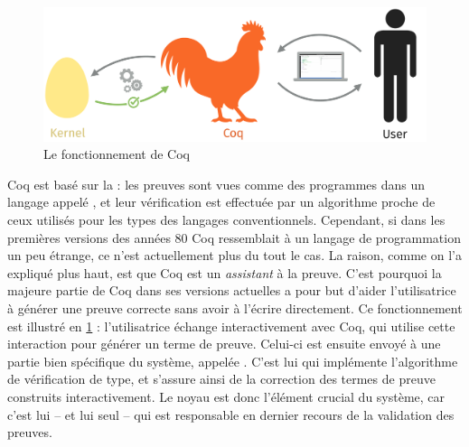   \begin{figure}[h]

    \centering
    \includegraphics{./figures/coq-kernel-fr.pdf}
  
    \caption{Le fonctionnement de Coq}
    \label{fig-coq}
  \end{figure}

  Coq est basé sur la  : les preuves sont vues comme des programmes dans un langage appelé ,
  et leur vérification est effectuée par un algorithme proche
  de ceux utilisés pour les types des langages conventionnels.
  Cependant, si dans les premières versions des années 80 Coq ressemblait à un langage de programmation un peu étrange, ce n’est actuellement plus du tout le cas.
  La raison, comme on l’a expliqué plus haut, est que Coq est un \emph{assistant} à la preuve.
  C’est pourquoi la majeure partie de Coq dans ses versions actuelles a pour but d’aider l’utilisatrice à générer une preuve correcte sans avoir à l’écrire directement.
  Ce fonctionnement est illustré en \cref{fig-coq} : l’utilisatrice échange interactivement avec Coq, qui utilise cette interaction pour générer un terme de preuve. Celui-ci est ensuite envoyé à une partie bien spécifique du système, appelée .
  C’est lui qui implémente l’algorithme de vérification de type, et s’assure ainsi de la correction des termes de preuve construits interactivement.
  Le noyau est donc l’élément crucial du système, car c’est lui – et lui seul – qui est responsable en dernier recours de la validation des preuves.
  
